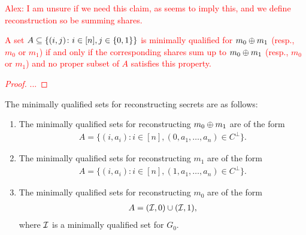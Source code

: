 \textcolor{red}{Alex: I am unsure if we need this claim, as  seems to imply this, and we define reconstruction so be summing shares.
\begin{myclaim}\label{clm:min-secret}
	A set $A \subseteq \{(i,j)\colon i \in [n], j \in {\{0,1\}} \}$ is minimally qualified for $m_0\oplus m_1$ (resp., $m_0$ or $m_1$) if and only if the corresponding shares sum up to $m_0\oplus m_1$ (resp., $m_0$ or $m_1$) and no proper subset of $A$ satisfies this property.
\end{myclaim}
\begin{proof}
	...
\end{proof}
}

\begin{lemma}\label{lem:min-qual-secret}
	The minimally qualified sets for reconstructing secrets are as follows:
	\begin{enumerate}
		\item The minimally qualified sets for reconstructing $m_0\oplus m_1$ are of the form
		\begin{align*}
			A = \{ (i,a_i)\colon i \in [n], (0,a_1,\dotsc, a_n) \in C^\perp \}.
		\end{align*}
		\item The minimally qualified sets for reconstructing $m_1$ are of the form
		\begin{align*}
			A = \{ (i,a_i)\colon i \in [n], (1,a_1,\dotsc, a_n) \in C^\perp \}.
		\end{align*}
		\item The minimally qualified sets for reconstructing $m_0$ are of the form
		\begin{align*}
			A = ({\mathcal I},0) \cup ({\mathcal I}, 1),
		\end{align*}
		where ${\mathcal I}$ is a minimally qualified set for $G_0$.
	\end{enumerate}
\end{lemma}
